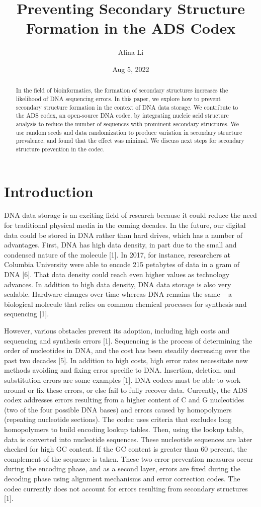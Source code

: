 \documentclass{article}
\title{Preventing Secondary Structure Formation in the ADS Codex}
\author{Alina Li}
\date{Aug 5, 2022}
\begin{document}
 
\maketitle

\begin{abstract}
In the field of bioinformatics, the formation of secondary structures increases the likelihood of DNA sequencing errors. In this paper, we explore how to prevent secondary structure formation in the context of DNA data storage. We contribute to the ADS codex, an open-source DNA codec, by integrating nucleic acid structure analysis to reduce the number of sequences with prominent secondary structures. We use random seeds and data randomization to produce variation in secondary structure prevalence, and found that the effect was minimal. We discuss next steps for secondary structure prevention in the codec.
\end{abstract}

\section{Introduction}
DNA data storage is an exciting field of research because it could reduce the need for traditional physical media in the coming decades. In the future, our digital data could be stored in DNA rather than hard drives, which has a number of advantages. First, DNA has high data density, in part due to the small and condensed nature of the molecule [1]. In 2017, for instance, researchers at Columbia University were able to encode 215 petabytes of data in a gram of DNA [6]. That data density could reach even higher values as technology advances. In addition to high data density, DNA data storage is also very scalable. Hardware changes over time whereas DNA remains the same -- a biological molecule that relies on common chemical processes for synthesis and sequencing [1].  

However, various obstacles prevent its adoption, including high costs and sequencing and synthesis errors [1]. Sequencing is the process of determining the order of nucleotides in DNA, and the cost has been steadily decreasing over the past two decades [5]. In addition to high costs, high error rates necessitate new methods avoiding and fixing error specific to DNA. Insertion, deletion, and substitution errors are some examples [1]. DNA codecs must be able to work around or fix these errors, or else fail to fully recover data. Currently, the ADS codex addresses errors resulting from a higher content of C and G nucleotides (two of the four possible DNA bases) and errors caused by homopolymers (repeating nucleotide sections). The codec uses  criteria that excludes long homopolymers to build encoding lookup tables. Then, using the lookup table, data is converted into nucleotide sequences. These nucleotide sequences are later checked for high GC content. If the GC content is greater than 60 percent, the complement of the sequence is taken. These two error prevention measures occur during the encoding phase, and as a second layer, errors are fixed during the decoding phase using alignment mechanisms and error correction codes. The codec currently does not account for errors resulting from secondary structures [1].
\end{document}
